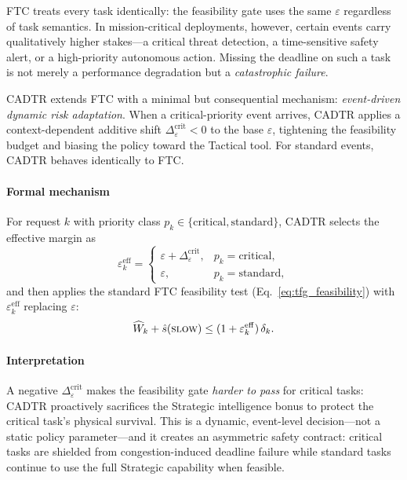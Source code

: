 \documentclass[preprint,12pt]{elsarticle}
\begin{document}
FTC treats every task identically: the feasibility gate uses the same $\varepsilon$ regardless of task semantics. In mission-critical deployments, however, certain events carry qualitatively higher stakes---a critical threat detection, a time-sensitive safety alert, or a high-priority autonomous action. Missing the deadline on such a task is not merely a performance degradation but a \emph{catastrophic failure}.

CADTR extends FTC with a minimal but consequential mechanism: \emph{event-driven dynamic risk adaptation}. When a critical-priority event arrives, CADTR applies a context-dependent additive shift $\Delta_{\varepsilon}^{\mathrm{crit}} < 0$ to the base $\varepsilon$, tightening the feasibility budget and biasing the policy toward the Tactical tool. For standard events, CADTR behaves identically to FTC.

\paragraph{Formal mechanism}
For request $k$ with priority class $p_k \in \{\text{critical}, \text{standard}\}$, CADTR selects the effective margin as
\begin{equation}
\varepsilon_k^{\mathrm{eff}} = 
\begin{cases}
\varepsilon + \Delta_{\varepsilon}^{\mathrm{crit}}, & p_k = \text{critical},\\
\varepsilon, & p_k = \text{standard},
\end{cases}
\label{eq:cadtr_eps_shift}
\end{equation}
and then applies the standard FTC feasibility test (Eq.~\eqref{eq:tfg_feasibility}) with $\varepsilon_k^{\mathrm{eff}}$ replacing $\varepsilon$:
\begin{equation}
\widehat{W}_k + \hat{s}(\textsc{slow}) \le (1+\varepsilon_k^{\mathrm{eff}})\,\delta_k.
\label{eq:cadtr_feasibility}
\end{equation}

\paragraph{Interpretation}
A negative $\Delta_{\varepsilon}^{\mathrm{crit}}$ makes the feasibility gate \emph{harder to pass} for critical tasks: CADTR proactively sacrifices the Strategic intelligence bonus to protect the critical task's physical survival. This is a dynamic, event-level decision---not a static policy parameter---and it creates an asymmetric safety contract: critical tasks are shielded from congestion-induced deadline failure while standard tasks continue to use the full Strategic capability when feasible.
\end{document}
